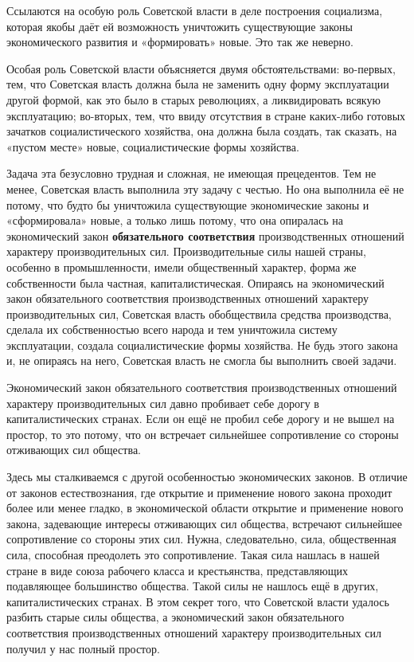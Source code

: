 \documentclass[12pt, a4paper, openany]{book}
\begin{document}
Ссылаются на особую роль Советской власти в деле построения социализма, которая якобы даёт ей возможность уничтожить существующие законы экономического развития и «формировать» новые. Это так же неверно.

Особая роль Советской власти объясняется двумя обстоятельствами: во-первых, тем, что Советская власть должна была не заменить одну форму эксплуатации другой формой, как это было в старых революциях, а ликвидировать всякую эксплуатацию; во-вторых, тем, что ввиду отсутствия в стране каких-либо готовых зачатков социалистического хозяйства, она должна была создать, так сказать, на «пустом месте» новые, социалистические формы хозяйства.

Задача эта безусловно трудная и сложная, не имеющая прецедентов. Тем не менее, Советская власть выполнила эту задачу с честью. Но она выполнила её не потому, что будто бы уничтожила существующие экономические законы и «сформировала» новые, а только лишь потому, что она опиралась на экономический закон \textbf{обязательного соответствия} производственных отношений характеру производительных сил. Производительные силы нашей страны, особенно в промышленности, имели общественный характер, форма же собственности была частная, капиталистическая. Опираясь на экономический закон обязательного соответствия производственных отношений характеру производительных сил, Советская власть обобществила средства производства, сделала их собственностью всего народа и тем уничтожила систему эксплуатации, создала социалистические формы хозяйства. Не будь этого закона и, не опираясь на него, Советская власть не смогла бы выполнить своей задачи.

Экономический закон обязательного соответствия производственных отношений характеру производительных сил давно пробивает себе дорогу в капиталистических странах. Если он ещё не пробил себе дорогу и не вышел на простор, то это потому, что он встречает сильнейшее сопротивление со стороны отживающих сил общества.

Здесь мы сталкиваемся с другой особенностью экономических законов. В отличие от законов естествознания, где открытие и применение нового закона проходит более или менее гладко, в экономической области открытие и применение нового закона, задевающие интересы отживающих сил общества, встречают сильнейшее сопротивление со стороны этих сил. Нужна, следовательно, сила, общественная сила, способная преодолеть это сопротивление. Такая сила нашлась в нашей стране в виде союза рабочего класса и крестьянства, представляющих подавляющее большинство общества. Такой силы не нашлось ещё в других, капиталистических странах. В этом секрет того, что Советской власти удалось разбить старые силы общества, а экономический закон обязательного соответствия производственных отношений характеру производительных сил получил у нас полный простор.
\end{document}

